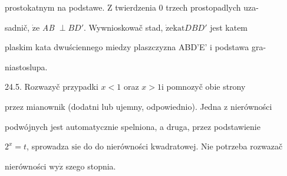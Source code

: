 \documentclass[a4paper,12pt]{article}
\begin{document}
prostokatnym na podstawe. $\mathrm{Z}$ twierdzenia $0$ trzech prostopadlych uza-

sadnič, $\dot{\mathrm{z}}\mathrm{e}$ {\it AB} $\perp BD'$. Wywnioskowač stad, $\dot{\mathrm{z}}\mathrm{e} \mathrm{k}\mathrm{a}\mathrm{t} DBD'$ jest katem

plaskim kata dwuściennego miedzy plaszczyzna ABD'E' $\mathrm{i}$ podstawa gra-

niastoslupa.

24.5. Rozwazyč przypadki $x < 1$ oraz $x > 1 \mathrm{i}$ pomnozyč obie strony

przez mianownik (dodatni lub ujemny, odpowiednio). Jedna $\mathrm{z}$ nierówności

podwójnych jest automatycznie spelniona, a druga, przez podstawienie

$2^{x}=t$, sprowadza $\mathrm{s}\mathrm{i}\mathrm{e}$ do do nierówności kwadratowej. Nie potrzeba rozwazač

nierówności $\mathrm{w}\mathrm{y}\dot{\mathrm{z}}$ szego stopnia.
\end{document}
